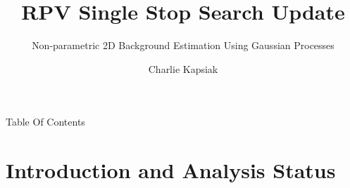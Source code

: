 \documentclass[10pt]{beamer}
\author{Charlie Kapsiak}
\title[Single Stop Update]{RPV Single Stop Search Update}
\subtitle{Non-parametric 2D Background Estimation Using Gaussian Processes}
\begin{document}
\begin{frame}
  \maketitle
\end{frame}

\begin{frame}{Table Of Contents}
  \tableofcontents
\end{frame}

%
%  
%
%
%
%

\section[Intro]{Introduction and Analysis Status}
\end{document}
